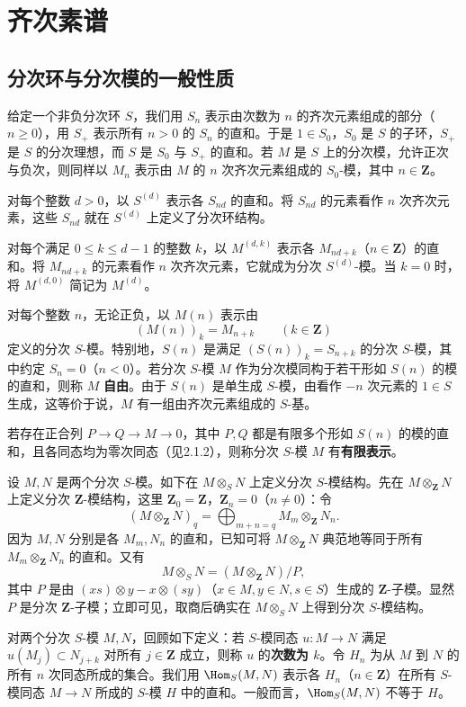 \section{齐次素谱}
\subsection{分次环与分次模的一般性质}
给定一个非负分次环 $S$，我们用 $S_n$ 表示由次数为 $n$ 的齐次元素组成的部分（$n\geq0$），用 $S_+$ 表示所有 $n>0$ 的 $S_n$ 的直和。于是 $1\in S_0$，$S_0$ 是 $S$ 的子环，$S_+$ 是 $S$ 的分次理想，而 $S$ 是 $S_0$ 与 $S_+$ 的直和。若 $M$ 是 $S$ 上的分次模，允许正次与负次，则同样以 $M_n$ 表示由 $M$ 的 $n$ 次齐次元素组成的 $S_0$-模，其中 $n\in\mathbf Z$。

对每个整数 $d>0$，以 $S^{(d)}$ 表示各 $S_{nd}$ 的直和。将 $S_{nd}$ 的元素看作 $n$ 次齐次元素，这些 $S_{nd}$ 就在 $S^{(d)}$ 上定义了分次环结构。

对每个满足 $0\leq k\leq d-1$ 的整数 $k$，以 $M^{(d,k)}$ 表示各 $M_{nd+k}$（$n\in\mathbf Z$）的直和。将 $M_{nd+k}$ 的元素看作 $n$ 次齐次元素，它就成为分次 $S^{(d)}$-模。当 $k=0$ 时，将 $M^{(d,0)}$ 简记为 $M^{(d)}$。

对每个整数 $n$，无论正负，以 $M(n)$ 表示由
\[
(M(n))_k=M_{n+k}\qquad(k\in\mathbf Z)
\]
定义的分次 $S$-模。特别地，$S(n)$ 是满足 $(S(n))_k=S_{n+k}$ 的分次 $S$-模，其中约定 $S_n=0$（$n<0$）。若分次 $S$-模 $M$ 作为分次模同构于若干形如 $S(n)$ 的模的直和，则称 $M$ \textbf{自由}。由于 $S(n)$ 是单生成 $S$-模，由看作 $-n$ 次元素的 $1\in S$ 生成，这等价于说，$M$ 有一组由齐次元素组成的 $S$-基。

若存在正合列 $P\to Q\to M\to0$，其中 $P,Q$ 都是有限多个形如 $S(n)$ 的模的直和，且各同态均为零次同态（见2.1.2），则称分次 $S$-模 $M$ 有\textbf{有限表示}。

设 $M,N$ 是两个分次 $S$-模。如下在 $M\otimes_SN$ 上定义分次 $S$-模结构。先在 $M\otimes_{\mathbf Z}N$ 上定义分次 $\mathbf Z$-模结构，这里 $\mathbf Z_0=\mathbf Z$，$\mathbf Z_n=0$（$n\ne0$）：令
\[
(M\otimes_{\mathbf Z}N)_q=\bigoplus_{m+n=q}M_m\otimes_{\mathbf Z}N_n.
\]
因为 $M,N$ 分别是各 $M_m,N_n$ 的直和，已知可将 $M\otimes_{\mathbf Z}N$ 典范地等同于所有 $M_m\otimes_{\mathbf Z}N_n$ 的直和。又有
\[
M\otimes_SN=(M\otimes_{\mathbf Z}N)/P,
\]
其中 $P$ 是由 $(xs)\otimes y-x\otimes(sy)$（$x\in M,y\in N,s\in S$）生成的 $\mathbf Z$-子模。显然 $P$ 是分次 $\mathbf Z$-子模；立即可见，取商后确实在 $M\otimes_SN$ 上得到分次 $S$-模结构。

对两个分次 $S$-模 $M,N$，回顾如下定义：若 $S$-模同态 $u:M\to N$ 满足
$u(M_j)\subset N_{j+k}$ 对所有 $j\in\mathbf Z$ 成立，则称 $u$ 的\textbf{次数为 $k$}。令 $H_n$ 为从 $M$ 到 $N$ 的所有 $n$ 次同态所成的集合。我们用 $\Hom_S(M,N)$ 表示各 $H_n$（$n\in\mathbf Z$）在所有 $S$-模同态 $M\to N$ 所成的 $S$-模 $H$ 中的直和。一般而言，$\Hom_S(M,N)$ 不等于 $H$。

